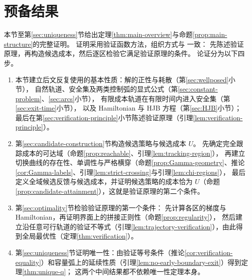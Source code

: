 \documentclass[11pt,a4paper,UTF8]{ctexart}
\theoremstyle{definition}
\begin{document}
\section{预备结果}
\label{sec:preliminaries}

本节至第\ref{sec:uniqueness}节给出定理\ref{thm:main-overview}与命题\ref{prop:main-structure}的完整证明。
证明采用验证函数方法，组织方式与 \citet[附录A]{MicloSpiroWeibull2022} 一致：
先陈述验证原理，再构造候选成本，然后逐区检验它满足验证原理的条件。
论证分为以下四步。
\begin{enumerate}
\item 本节建立后文反复使用的基本性质：解的正性与耗散（第\ref{sec:wellposed}小节），
自然轨道、安全集及两类控制弧的显式公式（第\ref{sec:constant-problem}、\ref{sec:arcs}小节），
有限成本轨道在有限时间内进入安全集（第\ref{sec:exit-time}小节），
以及 Hamiltonian 与 HJB 方程（第\ref{sec:HJB}小节）；
最后在第\ref{sec:verification-principle}小节陈述验证原理（引理\ref{lem:verification-principle}）。
\item 第\ref{sec:candidate-construction}节构造候选策略与候选成本 $U$。
先确定完全跟踪成本的可达域（命题\ref{prop:reachable}、引理\ref{lem:tracking-region}），
再建立切换曲线的存在性、单调性与严格横穿（命题\ref{prop:Gamma-geometry}、推论\ref{cor:Gamma-labels}、引理\ref{lem:strict-crossing}与引理\ref{lem:chi-regions}），
最后定义全域候选反馈与候选成本，并证明候选策略的成本恰为 $U$（命题\ref{prop:candidate-attainment}），这就是验证原理的第二个条件。
\item 第\ref{sec:optimality}节检验验证原理的第一个条件：
先计算各区的梯度与 Hamiltonian，再证明界面上的拼接正则性（命题\ref{prop:regularity}），
然后建立沿任意可行轨道的验证不等式（引理\ref{lem:trajectory-verification}），由此得到全局最优性（定理\ref{thm:verification}）。
\item 第\ref{sec:uniqueness}节证明唯一性：由验证等号条件（推论\ref{cor:verification-equality}）和容量弧上的延续性质（引理\ref{lem:no-early-boundary-exit}）得到定理\ref{thm:unique-q}；
这两个中间结果都不依赖唯一性定理本身。
\end{enumerate}
\end{document}
